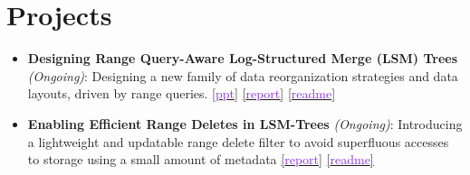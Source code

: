 \documentclass[10pt,a4paper,calibri]{moderncv}
\newcommand{\beforesection}{\vspace{-0.5em}}
\begin{document}
\beforesection

\section{Projects}

\begin{itemize}\setlength\itemsep{0.3em}
  \item \textbf{Designing Range Query-Aware Log-Structured Merge (LSM) Trees} \textit{(Ongoing)}: Designing a new 
  family of data reorganization strategies and data layouts, driven by range queries.
  \href{https://drive.google.com/file/d/19AeEG3e_Tao52vNcxTtTuzZMYfD2s9Tx/view?usp=sharing}{[\textcolor{blueviolet}{ppt}]}
  \href{https://drive.google.com/file/d/1g9B3lbKy7yektDqqtbGGdYSRTl7-SEvC/view?usp=sharing}{[\textcolor{blueviolet}{report}]}
  \href{https://github.com/shubham-sudo/LSMQueryDrivenCompaction}{[\textcolor{blueviolet}{readme}]}


  \item \textbf{Enabling Efficient Range Deletes in LSM-Trees} \textit{(Ongoing)}: Introducing a lightweight and updatable range delete filter to avoid 
  superfluous accesses to storage using a small amount of metadata
  \href{https://drive.google.com/file/d/1MNnnk1DBNMEPNbv99z1D3LM3pILTUgj1/view?usp=sharing}{[\textcolor{blueviolet}{report}]}
  \href{https://github.com/shubham-sudo/LSMRangeDeletes}{[\textcolor{blueviolet}{readme}]}



\end{itemize}
\end{document}
